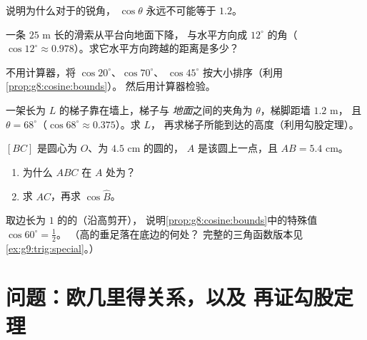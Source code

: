 \begin{exercise}[$\star$]\label{exo:g8:cosine:6}
说明为什么对于的锐角，
$\cos\theta$ 永远不可能等于 $1.2$。
\end{exercise}

\begin{exercise}[$\star\star$]\label{exo:g8:cosine:7}
一条 $25$ m 长的滑索从平台向地面下降，
与水平方向成 $12^\circ$ 的角（$\cos 12^\circ \approx
0.978$）。求它水平方向跨越的距离是多少？
\end{exercise}

\begin{exercise}[$\star\star$]\label{exo:g8:cosine:8}
不用计算器，将 $\cos 20^\circ$、$\cos 70^\circ$、
$\cos 45^\circ$ 按大小排序（利用\cref{prop:g8:cosine:bounds}）。
然后用计算器检验。
\end{exercise}

\begin{exercise}[$\star\star$]\label{exo:g8:cosine:9}
一架长为 $L$ 的梯子靠在墙上，梯子与
\emph{地面}之间的夹角为 $\theta$，梯脚距墙 $1.2$ m，
且 $\theta = 68^\circ$（$\cos 68^\circ \approx 0.375$）。求 $L$，
再求梯子所能到达的高度（利用勾股定理）。
\end{exercise}

\begin{exercise}[$\star\star$]\label{exo:g8:cosine:10}
$[BC]$ 是圆心为 $O$、为 $4.5$ cm 的圆的，
$A$ 是该圆上一点，且 $AB = 5.4$ cm。
\begin{enumerate}
  \item 为什么 $ABC$ 在 $A$ 处为？
  \item 求 $AC$，再求 $\cos \widehat B$。
\end{enumerate}
\end{exercise}

\begin{exercise}[$\star\star\star$]\label{exo:g8:cosine:11}
取边长为 $1$ 的的（沿高剪开），
说明\cref{prop:g8:cosine:bounds}中的特殊值 $\cos 60^\circ = \frac12$。
（高的垂足落在底边的何处？
完整的三角函数版本见
\cref{ex:g9:trig:special}。）
\end{exercise}

\section{问题：欧几里得关系，以及
再证勾股定理}

